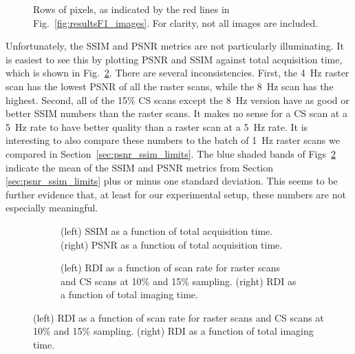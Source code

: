 \begin{figure}[t!]
    
    \caption{Rows of pixels, as indicated by the red lines in Fig.~\ref{fig:resultsF1_images}. For clarity, not all images are included.}  
    \label{fig:pixel_rows}
\end{figure}

Unfortunately, the SSIM and PSNR metrics are not particularly illuminating. It is easiest to see this by plotting PSNR and SSIM against total acquisition time, which is shown in Fig.~\ref{fig:time_ssim_psnr}.
There are several inconsistencies. First, the 4~Hz raster scan has the lowest PSNR of all the raster scans, while the 8~Hz scan has the highest. Second, all of the 15\% CS scans except the 8~Hz version have as good or better SSIM numbers than the raster scans. It makes no sense for a CS scan at a 5~Hz rate to have better quality than a raster scan at a 5~Hz rate. It is interesting to also compare these numbers to the batch of 1~Hz raster scans we compared in Section~\ref{sec:psnr_ssim_limits}. The blue shaded bands of Figs~\ref{fig:time_ssim_psnr} indicate the mean of the SSIM and PSNR metrics from Section \ref{sec:psnr_ssim_limits} plus or minus one standard deviation. This seems to be further evidence that, at least for our experimental setup, these numbers are not especially meaningful.

\begin{figure}[t!]
    \begin{subfigure}{1\textwidth}
    
    \caption{(left) SSIM as a function of total acquisition time. (right) PSNR as a function of total acquisition time.}
    \label{fig:time_ssim_psnr}
  \end{subfigure}
  
  \begin{subfigure}{1\textwidth}
    
   \caption{(left) RDI as a function of scan rate for raster scans and CS scans at 10\% and 15\% sampling. (right) RDI as a function of total imaging time.}
    \label{fig:time_damage}
  \end{subfigure}

  \label{fig:time_vs_metrics}
\end{figure}

